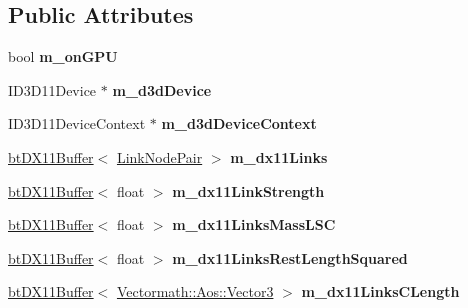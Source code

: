 \subsection*{Public Attributes}
\begin{DoxyCompactItemize}
\item 
\mbox{\label{classbtSoftBodyLinkDataDX11_a1a501b4687c49c9d3f06998b9326b738}} 
bool {\bfseries m\+\_\+on\+G\+PU}
\item 
\mbox{\label{classbtSoftBodyLinkDataDX11_a7d5c7617ed6f8cad0b69090c5d636c9e}} 
I\+D3\+D11\+Device $\ast$ {\bfseries m\+\_\+d3d\+Device}
\item 
\mbox{\label{classbtSoftBodyLinkDataDX11_a0c7489b5f59136f84d7aa60809e38dc9}} 
I\+D3\+D11\+Device\+Context $\ast$ {\bfseries m\+\_\+d3d\+Device\+Context}
\item 
\mbox{\label{classbtSoftBodyLinkDataDX11_ae3b9586f5c6bece12b235a61979d0813}} 
\hyperlink{classbtDX11Buffer}{bt\+D\+X11\+Buffer}$<$ \hyperlink{classbtSoftBodyLinkData_1_1LinkNodePair}{Link\+Node\+Pair} $>$ {\bfseries m\+\_\+dx11\+Links}
\item 
\mbox{\label{classbtSoftBodyLinkDataDX11_a8d8527928a6790afaf8b49374bbf311d}} 
\hyperlink{classbtDX11Buffer}{bt\+D\+X11\+Buffer}$<$ float $>$ {\bfseries m\+\_\+dx11\+Link\+Strength}
\item 
\mbox{\label{classbtSoftBodyLinkDataDX11_a589676ab4d68898a0231f39cfcdd62c5}} 
\hyperlink{classbtDX11Buffer}{bt\+D\+X11\+Buffer}$<$ float $>$ {\bfseries m\+\_\+dx11\+Links\+Mass\+L\+SC}
\item 
\mbox{\label{classbtSoftBodyLinkDataDX11_a223cb7053a53575580ca3834ca935ea1}} 
\hyperlink{classbtDX11Buffer}{bt\+D\+X11\+Buffer}$<$ float $>$ {\bfseries m\+\_\+dx11\+Links\+Rest\+Length\+Squared}
\item 
\mbox{\label{classbtSoftBodyLinkDataDX11_acd78b55f575c2fec095491826c79a01c}} 
\hyperlink{classbtDX11Buffer}{bt\+D\+X11\+Buffer}$<$ \hyperlink{classVectormath_1_1Aos_1_1Vector3}{Vectormath\+::\+Aos\+::\+Vector3} $>$ {\bfseries m\+\_\+dx11\+Links\+C\+Length}

\end{DoxyCompactItemize}
